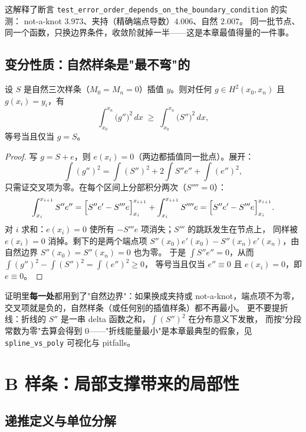 \begin{remark}
这解释了断言 \texttt{test\_error\_order\_depends\_on\_the\_boundary\_condition} 的实测：
not-a-knot $3.973$、夹持（精确端点导数）$4.006$、自然 $\mathbf{2.007}$。
同一批节点、同一个函数，只换边界条件，收敛阶就掉一半——这是本章最值得量的一件事。
\end{remark}

\subsection{变分性质：自然样条是"最不弯"的}

\begin{theorem}[最小曲率能量]
\label{thm:variational}
设 $S$ 是自然三次样条（$M_0=M_n=0$）插值 $y$。则对任何 $g\in H^2(x_0,x_n)$ 且
$g(x_i)=y_i$，有
\[
\int_{x_0}^{x_n}\bigl(g''\bigr)^2\,dx\;\ge\;\int_{x_0}^{x_n}\bigl(S''\bigr)^2\,dx ,
\]
等号当且仅当 $g=S$。
\end{theorem}

\begin{proof}
写 $g=S+e$，则 $e(x_i)=0$（两边都插值同一批点）。展开：
\[
\int (g'')^2=\int (S'')^2+2\int S''e''+\int (e'')^2 ,
\]
只需证交叉项为零。在每个区间上分部积分两次（$S''''=0$）：
\[
\int_{x_i}^{x_{i+1}}S''e''
=\Bigl[S''e'-S'''e\Bigr]_{x_i}^{x_{i+1}}+\int_{x_i}^{x_{i+1}}S''''e
=\Bigl[S''e'-S'''e\Bigr]_{x_i}^{x_{i+1}} .
\]
对 $i$ 求和：$e(x_i)=0$ 使所有 $-S'''e$ 项消失；$S'''$ 的跳跃发生在节点上，
同样被 $e(x_i)=0$ 消掉。剩下的是两个端点项
$S''(x_0)e'(x_0)-S''(x_n)e'(x_n)$，由自然边界 $S''(x_0)=S''(x_n)=0$ 也为零。
于是 $\int S''e''=0$，从而 $\int(g'')^2-\int(S'')^2=\int(e'')^2\ge0$，
等号当且仅当 $e''\equiv0$ 且 $e(x_i)=0$，即 $e\equiv0$。
\end{proof}

\begin{remark}
证明里\textbf{每一处}都用到了"自然边界"：如果换成夹持或 not-a-knot，端点项不为零，
交叉项就是负的，自然样条（或任何别的插值样条）都不再最小。
更不要提折线：折线的 $S''$ 是一串 delta 函数之和，$\int(S'')^2$ 在分布意义下发散，
而按"分段常数为零"去算会得到 $0$——"折线能量最小"是本章最典型的假象，见
\texttt{spline\_vs\_poly} 可视化与 pitfalls。
\end{remark}

\section{B 样条：局部支撑带来的局部性}

\subsection{递推定义与单位分解}

